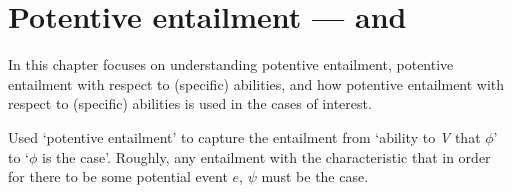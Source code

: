 
\chapter{Potentive entailment --- \AR{} and \WR{}}
\label{cha:potent-infer-attr}

\begin{note}[Overview]
  In this chapter focuses on understanding potentive entailment, potentive entailment with respect to (specific) abilities, and how potentive entailment with respect to (specific) abilities is used in the cases of interest.
\end{note}

\begin{note}
  Used `potentive entailment' to capture the entailment from `ability to \emph{V} that \(\phi\)' to `\(\phi\) is the case'.
  Roughly, any entailment with the characteristic that in order for there to be some potential event \(e\), \(\psi\) must be the case.
\end{note}

